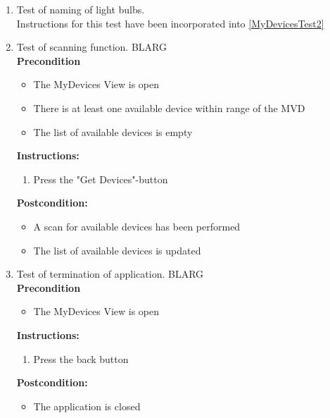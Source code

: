 \documentclass[a4paper]{article}
\newlength{\testlabellength}
\newenvironment{testlist}{\begin{enumerate}[label=\bfseries Instruction \thesubsection.\arabic* , labelindent=0pt, labelwidth=\testlabellength , leftmargin=2cm]}{\end{enumerate}}
\newenvironment{precondition}{
{\color{white}BLARG}\\ 
\textbf{Precondition}
\begin{itemize}[labelindent=0cm, labelwidth=2cm , leftmargin=1cm]
}
{\end{itemize}}
\newenvironment{instruction}{
\textbf{Instructions:}
\begin{enumerate}[label=\bfseries  \arabic*., labelindent=0cm, labelwidth=2cm , leftmargin=1cm]
}
{\end{enumerate}}
\newenvironment{postcondition}{
\textbf{Postcondition:}
\begin{itemize}[labelindent=0cm, labelwidth=2cm , leftmargin=1cm]
}
{\end{itemize}}
\begin{document}
\begin{appendices}
\begin{testlist}
	\item Test of naming of light bulbs. \\
		Instructions for this test have been incorporated into \ref{MyDevicesTest2}

		   
   
	\item Test of scanning function.
		\begin{precondition}
			\item The MyDevices View is open
			\item There is at least one available device within range of the MVD
			\item The list of available devices is empty
		\end{precondition}
		\begin{instruction}
			\item Press the "Get Devices"-button
		\end{instruction}
		\begin{postcondition}
			\item A scan for available devices has been performed
			\item The list of available devices is updated
		\end{postcondition}
		   
   
	\item Test of termination of application.
		\begin{precondition}
			\item The MyDevices View is open
		\end{precondition}
		\begin{instruction}
			\item Press the back button
		\end{instruction}
		\begin{postcondition}
			\item The application is closed
		\end{postcondition}
		   
    

\end{testlist}
\end{appendices}
\end{document}
